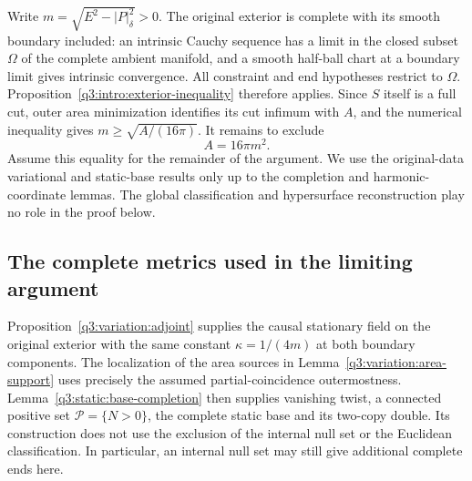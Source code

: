 Write $m=\sqrt{E^2-|P|_\delta^2}>0$. The original exterior is complete
with its smooth boundary included: an intrinsic Cauchy sequence has a
limit in the closed subset $\Omega$ of the complete ambient manifold,
and a smooth half-ball chart at a boundary limit gives intrinsic
convergence. All constraint and end hypotheses restrict to $\Omega$.
Proposition~\ref{q3:intro:exterior-inequality} therefore applies.
Since $S$ itself is a full cut, outer area minimization identifies its
cut infimum with $A$, and the numerical inequality gives
$m\geq\sqrt{A/(16\pi)}$. It remains to exclude
\begin{equation}\label{q3:local-spinor:equality}
 A=16\pi m^2.
\end{equation}
Assume this equality for the remainder of the argument. We use the
original-data variational and static-base results only up to the
completion and harmonic-coordinate lemmas. The global classification
and hypersurface reconstruction play no role in the proof below.

\subsection{The complete metrics used in the limiting argument}

Proposition~\ref{q3:variation:adjoint} supplies the causal stationary
field on the original exterior with the same constant
\(\kappa=1/(4m)\) at both boundary components. The localization of the area sources in
Lemma~\ref{q3:variation:area-support} uses precisely the assumed
partial-coincidence outermostness. Lemma~\ref{q3:static:base-completion}
then supplies vanishing twist, a connected positive set
\(\mathcal P=\{N>0\}\), the complete static base and its two-copy
double. Its construction does not use the exclusion of the internal
null set or the Euclidean classification. In particular,
an internal null set may still give additional complete ends here.

